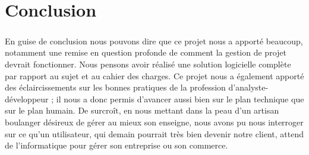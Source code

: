 \chapter*{Conclusion}

\paragraph{}
    En guise de conclusion nous pouvons dire que ce projet nous a apporté
    beaucoup, notamment une remise en question profonde de comment la gestion
    de projet devrait fonctionner. Nous pensons avoir réalisé une solution
    logicielle complète par rapport au sujet et au cahier des charges.
    Ce projet nous a également apporté des éclaircissements sur les bonnes
    pratiques de la profession d'analyste-développeur ; il nous a donc permis
    d'avancer aussi bien sur le plan technique que sur le plan humain.
    De surcroît, en nous mettant dans la peau d'un artisan boulanger désireux
    de gérer au mieux son enseigne, nous avons pu nous interroger sur ce qu'un
    utilisateur, qui demain pourrait très bien devenir notre client, attend de
    l'informatique pour gérer son entreprise ou son commerce.
